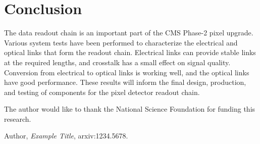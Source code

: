 \documentclass[a4paper,11pt]{article}
\begin{document}
\section{Conclusion}
\label{sec:conclusion}

The data readout chain is an important part of the CMS Phase-2 pixel upgrade.
Various system tests have been performed to characterize the electrical and optical links that form the readout chain.
Electrical links can provide stable links at the required lengths, and crosstalk has a small effect on signal quality.
Conversion from electrical to optical links is working well, and the optical links have good performance.
These results will inform the final design, production, and testing of components for the pixel detector readout chain.


\acknowledgments

The author would like to thank the National Science Foundation for funding this research.


\begin{thebibliography}{99}

Author, \emph{Example Title},
arxiv:1234.5678.

%
%



\end{thebibliography}
\end{document}
